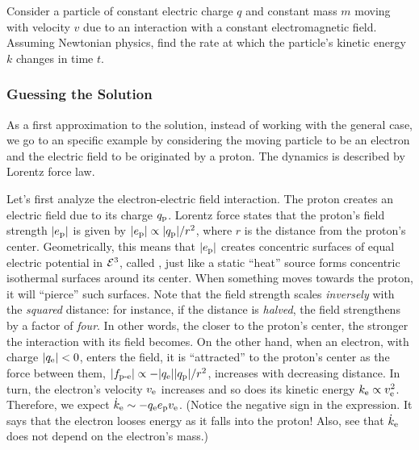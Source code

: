 \begin{example}
Consider a particle of constant electric charge $q$ and constant mass $m$ moving with velocity $v$ due to an interaction with a constant electromagnetic field. Assuming Newtonian physics, find the rate at which the particle's kinetic energy $k$ changes in time $t$.
\end{example}


\subsubsection{Guessing the Solution}

As a first approximation to the solution, instead of working with the general case, we go to an specific example by considering the moving particle to be an electron and the electric field to be originated by a proton. The dynamics is described by Lorentz force law.

Let's first analyze the electron-electric field interaction. The proton creates an electric field due to its charge $q_\text{p}$. Lorentz force states that the proton's field strength $\lvert{e_\text{p}}\rvert$ is given by $\lvert{e_\text{p}}\rvert\propto \lvert{q_\text{p}}\rvert/r^2$, where $r$ is the distance from the proton's center. Geometrically, this means that $\lvert{e_\text{p}}\rvert$ creates concentric surfaces of equal electric potential in $\mathcal{E}^{3}$, called , just like a static ``heat'' source forms concentric isothermal surfaces around its center. When something moves towards the proton, it will ``pierce'' such surfaces. Note that the field strength scales \emph{inversely} with the \emph{squared} distance: for instance, if the distance is \emph{halved}, the field strengthens by a factor of \emph{four}. In other words, the closer to the proton's center, the stronger the interaction with its field becomes. On the other hand, when an electron, with charge $\lvert{q_\text{e}}\rvert < 0$, enters the field, it is ``attracted'' to the proton's center as the force between them, $\lvert{f_\text{p-e}}\rvert\propto -\lvert{q_\text{e}}\rvert\lvert{q_\text{p}}\rvert/r^2$, increases with decreasing distance. In turn, the electron's velocity $v_\text{e}$ increases and so does its kinetic energy $k_\text{e} \propto v_\text{e}^2$. Therefore, we expect $\dot{k}_\text{e}\sim -q_\text{e}e_\text{p}v_\text{e}$. (Notice the negative sign in the expression. It says that the electron looses energy as it falls into the proton! Also, see that $\dot{k}_\text{e}$ does not depend on the electron's mass.)

